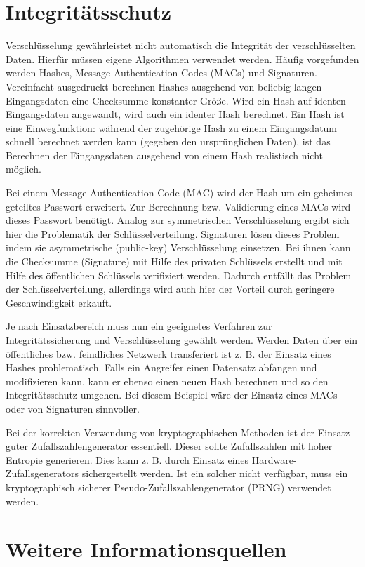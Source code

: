 \section{Integritätsschutz}

Verschlüsselung gewährleistet nicht automatisch die Integrität der verschlüsselten Daten. Hierfür müssen eigene Algorithmen verwendet werden. Häufig vorgefunden werden Hashes, Message Authentication Codes (MACs) und Signaturen. Vereinfacht ausgedruckt berechnen Hashes ausgehend von beliebig langen Eingangsdaten eine Checksumme konstanter Größe. Wird ein Hash auf identen Eingangsdaten angewandt, wird auch ein identer Hash berechnet. Ein Hash ist eine Einwegfunktion: während der zugehörige Hash zu einem Eingangsdatum schnell berechnet werden kann (gegeben den ursprünglichen Daten), ist das Berechnen der Eingangsdaten ausgehend von einem Hash realistisch nicht möglich.

Bei einem Message Authentication Code (MAC) wird der Hash um ein geheimes geteiltes Passwort erweitert. Zur Berechnung bzw. Validierung eines MACs wird dieses Passwort benötigt. Analog zur symmetrischen Verschlüsselung ergibt sich hier die Problematik der Schlüsselverteilung. Signaturen lösen dieses Problem indem sie asymmetrische (public-key) Verschlüsselung einsetzen. Bei ihnen kann die Checksumme (Signature) mit Hilfe des privaten Schlüssels erstellt und mit Hilfe des öffentlichen Schlüssels verifiziert werden. Dadurch entfällt das Problem der Schlüsselverteilung, allerdings wird auch hier der Vorteil durch geringere Geschwindigkeit erkauft.

Je nach Einsatzbereich muss nun ein geeignetes Verfahren zur Integritätssicherung und Verschlüsselung gewählt werden. Werden Daten über ein öffentliches bzw. feindliches Netzwerk transferiert ist z. B. der Einsatz eines Hashes problematisch. Falls ein Angreifer einen Datensatz abfangen und modifizieren kann, kann er ebenso einen neuen Hash berechnen und so den Integritätsschutz umgehen. Bei diesem Beispiel wäre der Einsatz eines MACs oder von Signaturen sinnvoller.

Bei der korrekten Verwendung von kryptographischen Methoden ist der Einsatz guter Zufallszahlengenerator essentiell. Dieser sollte Zufallszahlen mit hoher Entropie generieren. Dies kann z. B. durch Einsatz eines Hardware-Zufallsgenerators sichergestellt werden. Ist ein solcher nicht verfügbar, muss ein kryptographisch sicherer Pseudo-Zufallszahlengenerator (PRNG) verwendet werden.

\section{Weitere Informationsquellen}

